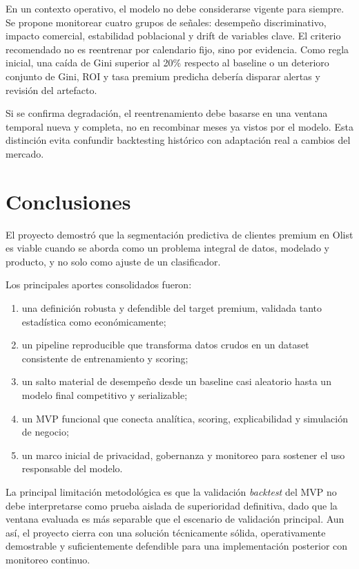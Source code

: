\documentclass[journal,letterpaper]{IEEEtran}
\begin{document}
En un contexto operativo, el modelo no debe considerarse vigente para siempre. Se propone monitorear cuatro grupos de señales: desempeño discriminativo, impacto comercial, estabilidad poblacional y drift de variables clave. El criterio recomendado no es reentrenar por calendario fijo, sino por evidencia. Como regla inicial, una caída de Gini superior al 20\% respecto al baseline o un deterioro conjunto de Gini, ROI y tasa premium predicha debería disparar alertas y revisión del artefacto.

Si se confirma degradación, el reentrenamiento debe basarse en una ventana temporal nueva y completa, no en recombinar meses ya vistos por el modelo. Esta distinción evita confundir backtesting histórico con adaptación real a cambios del mercado.

\section{Conclusiones}
El proyecto demostró que la segmentación predictiva de clientes premium en Olist es viable cuando se aborda como un problema integral de datos, modelado y producto, y no solo como ajuste de un clasificador.

Los principales aportes consolidados fueron:
\begin{enumerate}
    \item una definición robusta y defendible del target premium, validada tanto estadística como económicamente;
    \item un pipeline reproducible que transforma datos crudos en un dataset consistente de entrenamiento y scoring;
    \item un salto material de desempeño desde un baseline casi aleatorio hasta un modelo final competitivo y serializable;
    \item un MVP funcional que conecta analítica, scoring, explicabilidad y simulación de negocio;
    \item un marco inicial de privacidad, gobernanza y monitoreo para sostener el uso responsable del modelo.
\end{enumerate}

La principal limitación metodológica es que la validación \textit{backtest} del MVP no debe interpretarse como prueba aislada de superioridad definitiva, dado que la ventana evaluada es más separable que el escenario de validación principal. Aun así, el proyecto cierra con una solución técnicamente sólida, operativamente demostrable y suficientemente defendible para una implementación posterior con monitoreo continuo.
\end{document}
